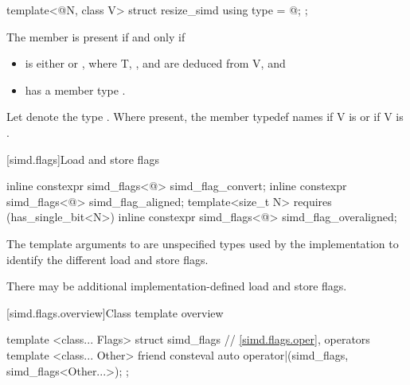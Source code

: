 \begin{itemdecl}
template<@\simdsizetype@ N, class V> struct resize_simd { using type = @\seebelow@; };
\end{itemdecl}

\begin{itemdescr}
  \pnum
  The member  is present if and only if
  \begin{itemize}
    \item {} is either  or , where \tcode T, , and  are deduced from \tcode V, and
    \item {} has a member type .
  \end{itemize}

  \pnum
  Let  denote the type .
  Where present, the member typedef  names  if \tcode V is  or  if \tcode V is .
\end{itemdescr}

[simd.flags]{Load and store flags}

\begin{itemdecl}
inline constexpr simd_flags<@\seebelow@> simd_flag_convert{};
inline constexpr simd_flags<@\seebelow@> simd_flag_aligned{};
template<size_t N> requires (has_single_bit<N>)
  inline constexpr simd_flags<@\seebelow@> simd_flag_overaligned{};
\end{itemdecl}

\begin{itemdescr}
  \pnum
  The template arguments to  are unspecified types used
  by the implementation to identify the different load and store flags.

  \pnum
  There may be additional implementation-defined load and store flags.
\end{itemdescr}

[simd.flags.overview]{Class template  overview}

\begin{codeblock}
template <class... Flags> struct simd_flags {
  // \ref{simd.flags.oper},  operators
  template <class... Other>
    friend consteval auto operator|(simd_flags, simd_flags<Other...>);
};
\end{codeblock}


